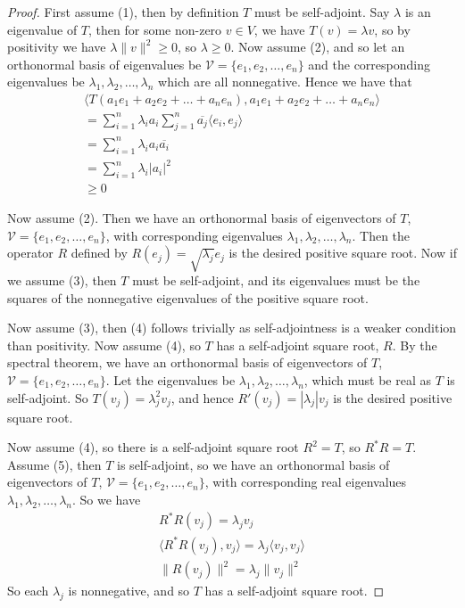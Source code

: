 \documentclass[]{article}
\begin{document}
\begin{proof}
		First assume (1), then by definition $T$ must be self-adjoint. Say $\lambda$ is an eigenvalue of $T$, then for some non-zero $v \in V$, we have $T(v) = \lambda v$, so by positivity we have $\lambda \|v\|^2 \geq 0$, so $\lambda \geq 0$. Now assume (2), and so let an orthonormal basis of eigenvalues be $\mathcal{V} = \{e_1, e_2, \ldots, e_n\}$ and the corresponding eigenvalues be $\lambda_1, \lambda_2, \ldots, \lambda_n$ which are all nonnegative. Hence we have that
		\begin{align*}
				\langle T(a_1 e_1 + a_2 e_2 + \ldots + a_n e_n), a_1 e_1 + a_2 e_2 + \ldots + a_n e_n \rangle \\
				= \sum_{i=1}^n \lambda_i a_i \sum_{j=1}^n \overline{a_j} \langle e_i, e_j \rangle \\
				= \sum_{i=1}^n \lambda_i a_i \overline{a_i} \\
		= \sum_{i=1}^n \lambda_i |a_i|^2 \\
		\geq 0
		\end{align*}

		Now assume (2). Then we have an orthonormal basis of eigenvectors of $T$, $\mathcal{V} = \{e_1, e_2, \ldots, e_n\}$, with corresponding eigenvalues $\lambda_1, \lambda_2, \ldots, \lambda_n$. Then the operator $R$ defined by $R(e_j) = \sqrt{\lambda_j} e_j$ is the desired positive square root. Now if we assume (3), then $T$ must be self-adjoint, and its eigenvalues must be the squares of the nonnegative eigenvalues of the positive square root.

		Now assume (3), then (4) follows trivially as self-adjointness is a weaker condition than positivity. Now assume (4), so $T$ has a self-adjoint square root, $R$. By the spectral theorem, we have an orthonormal basis of eigenvectors of $T$, $\mathcal{V} = \{e_1,e_2,\ldots,e_n\}$. Let the eigenvalues be $\lambda_1, \lambda_2, \ldots, \lambda_n$, which must be real as $T$ is self-adjoint. So $T(v_j) = \lambda_j^2 v_j$, and hence $R'(v_j) = |\lambda_j| v_j$ is the desired positive square root.

		Now assume (4), so there is a self-adjoint square root $R^2 = T$, so $R^*R = T$. Assume (5), then $T$ is self-adjoint, so we have an orthonormal basis of eigenvectors of $T$, $\mathcal{V} = \{e_1,e_2,\ldots,e_n\}$, with corresponding real eigenvalues $\lambda_1, \lambda_2, \ldots, \lambda_n$. So we have
		\begin{align*}
				R^*R(v_j) = \lambda_j v_j \\
				\langle R^*R(v_j), v_j \rangle = \lambda_j \langle v_j, v_j \rangle \\
				\|R(v_j)\|^2 = \lambda_j \|v_j\|^2
		\end{align*}
		So each $\lambda_j$ is nonnegative, and so $T$ has a self-adjoint square root.
\end{proof}
\end{document}
